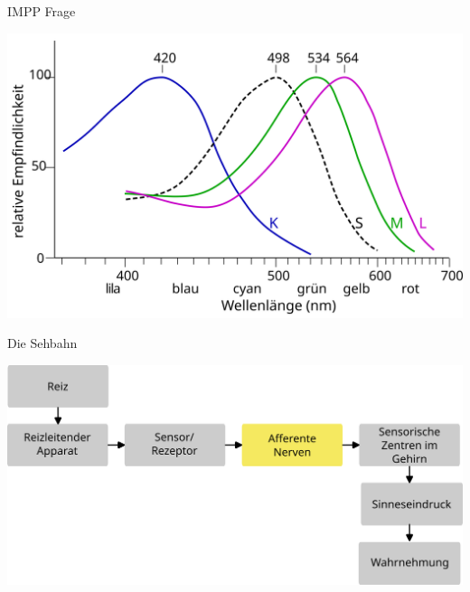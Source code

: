 \documentclass{beamer}
\begin{document}
\begin{frame}{IMPP Frage}
    
    \begin{center}
        \includegraphics[width=\textwidth]{Cone-response-de.png}
    \end{center}
    
\end{frame}









\begin{frame}{Die Sehbahn}

\begin{cener}
\includegraphics[width=\textwidth]{wahrnehmungsprozess_ohne_beispiel_bahnen.png}
\end{cener}

\end{frame}
\end{document}
